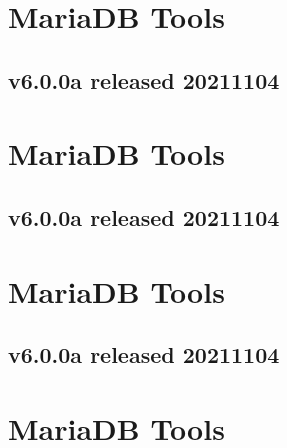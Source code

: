 \documentclass[letterpaper,10pt,english]{sphinxmanual}
\begin{document}
\chapter{MariaDB Tools}
\label{\detokenize{release_notes:id247}}

\section{v6.0.0a released 2021\sphinxhyphen{}11\sphinxhyphen{}04}
\label{\detokenize{release_notes:id248}}

\chapter{MariaDB Tools}
\label{\detokenize{release_notes:id249}}

\section{v6.0.0a released 2021\sphinxhyphen{}11\sphinxhyphen{}04}
\label{\detokenize{release_notes:id250}}

\chapter{MariaDB Tools}
\label{\detokenize{release_notes:id251}}

\section{v6.0.0a released 2021\sphinxhyphen{}11\sphinxhyphen{}04}
\label{\detokenize{release_notes:id252}}

\chapter{MariaDB Tools}
\label{\detokenize{release_notes:id253}}


\renewcommand{\indexname}{Index}
\printindex
\end{document}
